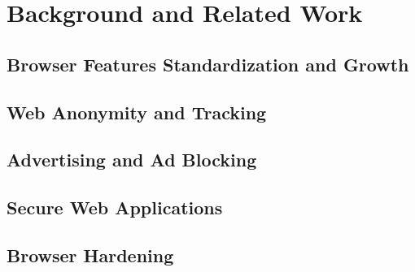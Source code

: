 \chapter{Background and Related Work}
\label{background}




\section{Browser Features Standardization and Growth}
\section{Web Anonymity and Tracking}
\section{Advertising and Ad Blocking}
\section{Secure Web Applications}
\section{Browser Hardening}